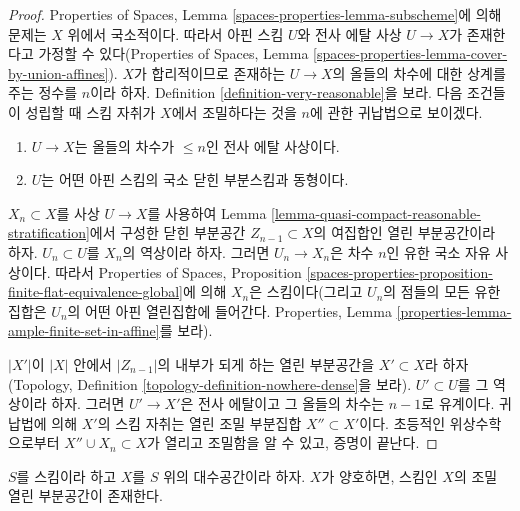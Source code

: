 \begin{proof}
Properties of Spaces, Lemma
\ref{spaces-properties-lemma-subscheme}에 의해 문제는 $X$ 위에서
국소적이다. 따라서 아핀 스킴 $U$와 전사 에탈 사상 $U \to X$가
존재한다고 가정할 수 있다(Properties of Spaces, Lemma
\ref{spaces-properties-lemma-cover-by-union-affines}).
$X$가 합리적이므로 존재하는 $U \to X$의 올들의 차수에 대한 상계를
주는 정수를 $n$이라 하자. Definition
\ref{definition-very-reasonable}을 보라. 다음 조건들이 성립할 때
스킴 자취가 $X$에서 조밀하다는 것을 $n$에 관한 귀납법으로 보이겠다.
\begin{enumerate}
\item $U \to X$는 올들의 차수가 $\leq n$인 전사 에탈 사상이다.
\item $U$는 어떤 아핀 스킴의 국소 닫힌 부분스킴과 동형이다.
\end{enumerate}

\medskip\noindent
$X_n \subset X$를 사상 $U \to X$를 사용하여 Lemma
\ref{lemma-quasi-compact-reasonable-stratification}에서 구성한
닫힌 부분공간 $Z_{n - 1} \subset X$의 여집합인 열린 부분공간이라
하자. $U_n \subset U$를 $X_n$의 역상이라 하자. 그러면
$U_n \to X_n$은 차수 $n$인 유한 국소 자유 사상이다.
따라서 Properties of Spaces, Proposition
\ref{spaces-properties-proposition-finite-flat-equivalence-global}에
의해 $X_n$은 스킴이다(그리고 $U_n$의 점들의 모든 유한집합은
$U_n$의 어떤 아핀 열린집합에 들어간다. Properties, Lemma
\ref{properties-lemma-ample-finite-set-in-affine}를 보라).

\medskip\noindent
$|X'|$이 $|X|$ 안에서 $|Z_{n - 1}|$의 내부가 되게 하는 열린
부분공간을 $X' \subset X$라 하자(Topology, Definition
\ref{topology-definition-nowhere-dense}을 보라).
$U' \subset U$를 그 역상이라 하자. 그러면 $U' \to X'$은 전사
에탈이고 그 올들의 차수는 $n - 1$로 유계이다.
귀납법에 의해 $X'$의 스킴 자취는 열린 조밀 부분집합
$X'' \subset X'$이다. 초등적인 위상수학으로부터
$X'' \cup X_n \subset X$가 열리고 조밀함을 알 수 있고, 증명이 끝난다.
\end{proof}

\begin{theorem}
\label{theorem-decent-open-dense-scheme}
$S$를 스킴이라 하고 $X$를 $S$ 위의 대수공간이라 하자.
$X$가 양호하면, 스킴인 $X$의 조밀 열린 부분공간이 존재한다.
\end{theorem}

